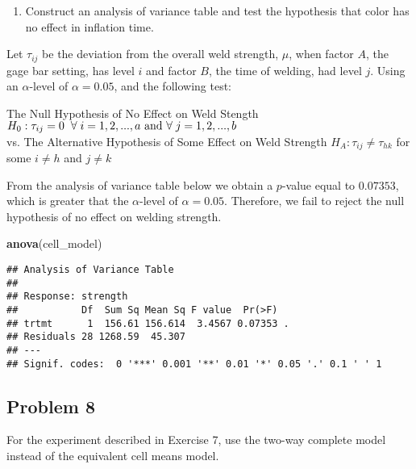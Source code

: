 \documentclass[12pt,]{article}
\newenvironment{Shaded}{\begin{snugshade}}{\end{snugshade}}
\newcommand{\KeywordTok}[1]{\textcolor[rgb]{0.13,0.29,0.53}{\textbf{#1}}}
\newcommand{\NormalTok}[1]{#1}
\providecommand{\tightlist}{%
  \setlength{\itemsep}{0pt}\setlength{\parskip}{0pt}}
\begin{document}
\begin{enumerate}
\def\labelenumi{(\alph{enumi})}
\setcounter{enumi}{2}
\tightlist
\item
  Construct an analysis of variance table and test the hypothesis that
  color has no effect in inflation time.
\end{enumerate}

Let \(\tau_{ij}\) be the deviation from the overall weld strength,
\(\mu\), when factor \(A\), the gage bar setting, has level \(i\) and
factor \(B\), the time of welding, had level \(j\). Using an
\(\alpha\)-level of \(\alpha = 0.05\), and the following test:

\begin{center}
 The Null Hypothesis of No Effect on Weld Stength  
 $H_0 : \tau_{ij} = 0 \hspace{.2cm }\forall \hspace{.1cm} i=1,2,...,a \text{ and }\forall  \hspace{.1cm} j=1,2,...,b$ \\
 vs. The Alternative Hypothesis of Some Effect on Weld Strength $H_A : \tau_{ij} \neq \tau_{hk}$ for some $i\neq h$ and $j\neq k$ 
\end{center}

From the analysis of variance table below we obtain a \(p\)-value equal
to \(0.07353\), which is greater that the \(\alpha\)-level of
\(\alpha = 0.05\). Therefore, we fail to reject the null hypothesis of
no effect on welding strength.

\begin{Shaded}
\begin{Highlighting}[]
\KeywordTok{anova}\NormalTok{(cell_model)}
\end{Highlighting}
\end{Shaded}

\begin{verbatim}
## Analysis of Variance Table
## 
## Response: strength
##           Df  Sum Sq Mean Sq F value  Pr(>F)  
## trtmt      1  156.61 156.614  3.4567 0.07353 .
## Residuals 28 1268.59  45.307                  
## ---
## Signif. codes:  0 '***' 0.001 '**' 0.01 '*' 0.05 '.' 0.1 ' ' 1
\end{verbatim}

\subsection{Problem 8}\label{problem-8}

For the experiment described in Exercise 7, use the two-way complete
model instead of the equivalent cell means model.
\end{document}
